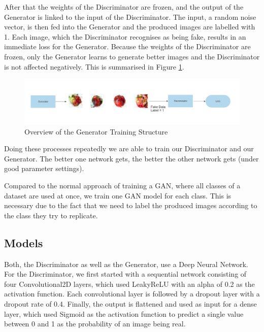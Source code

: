 \documentclass[13pt]{article}
\begin{document}
After that the weights of the Discriminator are frozen, and the output of the Generator is linked to the input of the Discriminator. The input, a random noise vector, is then fed into the Generator and the produced images are labelled with 1. Each image, which the Discriminator recognises as being fake, results in an immediate loss for the Generator. Because the weights of the Discriminator are frozen, only the Generator learns to generate better images and the Discriminator is not affected negatively. This is summarised in Figure \ref{fig:train_generator}.

\begin{figure}
\centering
\centerline{\includegraphics[width=\textwidth]{models/training_generator.png}}
\caption{Overview of the Generator Training Structure}
\label{fig:train_generator}
\end{figure}

Doing these processes repeatedly we are able to train our Discriminator and our Generator. The better one network gets, the better the other network gets (under good parameter settings).

Compared to the normal approach of training a GAN, where all classes of a dataset are used at once, we train one GAN model for each class. This is necessary due to the fact that we need to label the produced images according to the class they try to replicate.

\subsection{Models}
Both, the Discriminator as well as the Generator, use a Deep Neural Network.
For the Discriminator, we first started with a sequential network consisting of four Convolutional2D layers, which used LeakyReLU with an alpha of 0.2 as the activation function. Each convolutional layer is followed by a dropout layer with a dropout rate of 0.4.
Finally, the output is flattened and used as input for a dense layer, which used Sigmoid as the activation function to predict a single value between 0 and 1 as the probability of an image being real.
\end{document}
